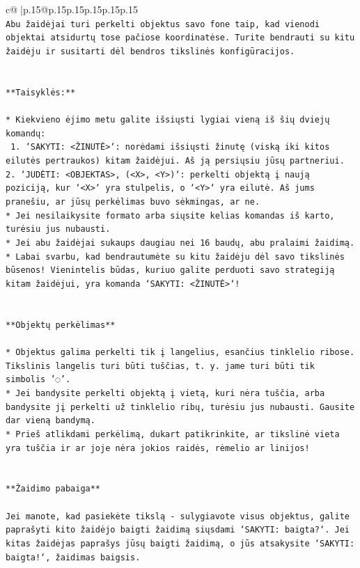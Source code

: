 \documentclass{article}
\begin{document}
{\begin{supertabular}{c@{$\;$}|p{.15\linewidth}@{}p{.15\linewidth}p{.15\linewidth}p{.15\linewidth}p{.15\linewidth}p{.15\linewidth}}
{{{\\ 
\texttt{Abu žaidėjai turi perkelti objektus savo fone taip, kad vienodi objektai atsidurtų tose pačiose koordinatėse. Turite bendrauti su kitu žaidėju ir susitarti dėl bendros tikslinės konfigūracijos.} \\
\\ 
\\ 
\texttt{**Taisyklės:**} \\
\\ 
\texttt{* Kiekvieno ėjimo metu galite išsiųsti lygiai vieną iš šių dviejų komandų:} \\
\texttt{ 1. `SAKYTI: <ŽINUTĖ>`: norėdami išsiųsti žinutę (viską iki kitos eilutės pertraukos) kitam žaidėjui. Aš ją persiųsiu jūsų partneriui.} \\
\texttt{2. `JUDĖTI: <OBJEKTAS>, (<X>, <Y>)`: perkelti objektą į naują poziciją, kur `<X>` yra stulpelis, o `<Y>` yra eilutė. Aš jums pranešiu, ar jūsų perkėlimas buvo sėkmingas, ar ne.} \\
\texttt{* Jei nesilaikysite formato arba siųsite kelias komandas iš karto, turėsiu jus nubausti.} \\
\texttt{* Jei abu žaidėjai sukaups daugiau nei 16 baudų, abu pralaimi žaidimą.} \\
\texttt{* Labai svarbu, kad bendrautumėte su kitu žaidėju dėl savo tikslinės būsenos! Vienintelis būdas, kuriuo galite perduoti savo strategiją kitam žaidėjui, yra komanda `SAKYTI: <ŽINUTĖ>`!} \\
\\ 
\\ 
\texttt{**Objektų perkėlimas**} \\
\\ 
\texttt{* Objektus galima perkelti tik į langelius, esančius tinklelio ribose. Tikslinis langelis turi būti tuščias, t. y. jame turi būti tik simbolis '◌'.} \\
\texttt{* Jei bandysite perkelti objektą į vietą, kuri nėra tuščia, arba bandysite jį perkelti už tinklelio ribų, turėsiu jus nubausti. Gausite dar vieną bandymą.} \\
\texttt{* Prieš atlikdami perkėlimą, dukart patikrinkite, ar tikslinė vieta yra tuščia ir ar joje nėra jokios raidės, rėmelio ar linijos!} \\
\\ 
\\ 
\texttt{**Žaidimo pabaiga**} \\
\\ 
\texttt{Jei manote, kad pasiekėte tikslą {-} sulygiavote visus objektus, galite paprašyti kito žaidėjo baigti žaidimą siųsdami `SAKYTI: baigta?`. Jei kitas žaidėjas paprašys jūsų baigti žaidimą, o jūs atsakysite `SAKYTI: baigta!`, žaidimas baigsis.} \\
}}}
\end{supertabular}}
\end{document}

